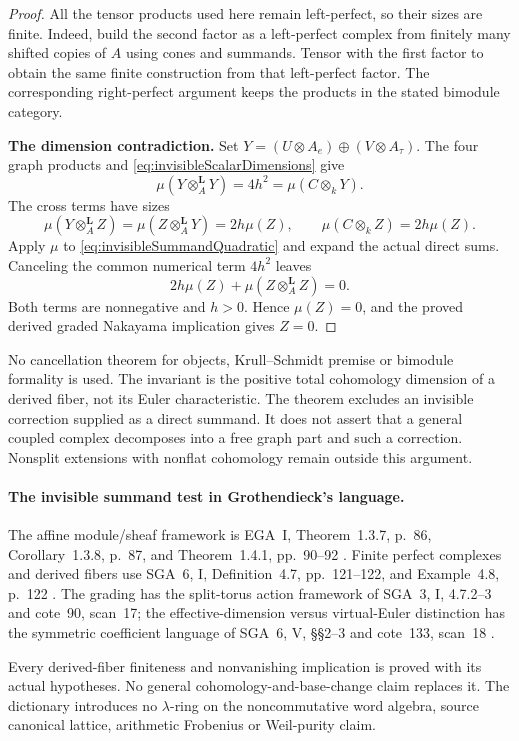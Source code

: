 \begin{proof}
All the tensor products used here remain left-perfect,
so their sizes are finite. Indeed, build the second
factor as a left-perfect complex from finitely many
shifted copies of \(A\) using cones and summands.
Tensor with the first factor to obtain the same finite
construction from that left-perfect factor.
The corresponding right-perfect argument keeps the
products in the stated bimodule category.

\par\smallskip\noindent\textbf{The dimension contradiction.}\quad
Set \(Y=(U\otimes A_e)\oplus(V\otimes A_\tau)\).
The four graph products and
\eqref{eq:invisibleScalarDimensions} give
\[
 \mu(Y\otimes_A^{\mathbf L}Y)=4h^2
                             =\mu(C\otimes_kY).
\]
The cross terms have sizes
\[
 \mu(Y\otimes_A^{\mathbf L}Z)
    =\mu(Z\otimes_A^{\mathbf L}Y)
    =2h\mu(Z),\qquad
 \mu(C\otimes_kZ)=2h\mu(Z).
\]
Apply \(\mu\) to \eqref{eq:invisibleSummandQuadratic}
and expand the actual direct sums.
Canceling the common numerical term \(4h^2\) leaves
\[
                     2h\mu(Z)
                       +\mu(Z\otimes_A^{\mathbf L}Z)=0.
\]
Both terms are nonnegative and \(h>0\).
Hence \(\mu(Z)=0\), and the proved derived graded
Nakayama implication gives \(Z=0\).
\end{proof}

No cancellation theorem for objects, Krull--Schmidt
premise or bimodule formality is used. The invariant
is the positive total cohomology dimension of a
derived fiber, not its Euler characteristic.
The theorem excludes an invisible correction supplied
as a direct summand. It does not assert that a general
coupled complex decomposes into a free graph part and
such a correction. Nonsplit extensions with nonflat
cohomology remain outside this argument.

\paragraph{The invisible summand test in Grothendieck's language.}
The affine module/sheaf framework is EGA~I,
Theorem~1.3.7, p.~86, Corollary~1.3.8, p.~87,
and Theorem~1.4.1, pp.~90--92 \cite{EGA}.
Finite perfect complexes and derived fibers use
SGA~6, I, Definition~4.7, pp.~121--122, and
Example~4.8, p.~122 \cite{SGA6}.
The grading has the split-torus action framework
of SGA~3, I, 4.7.2--3 and cote~90, scan~17;
the effective-dimension versus virtual-Euler distinction
has the symmetric coefficient language of SGA~6,
V, \S\S2--3 and cote~133, scan~18
\cite{SGA3,SGA6,Archive}.

Every derived-fiber finiteness and nonvanishing
implication is proved with its actual hypotheses.
No general cohomology-and-base-change claim replaces
it. The dictionary introduces no \(\lambda\)-ring on
the noncommutative word algebra, source canonical
lattice, arithmetic Frobenius or Weil-purity claim.
